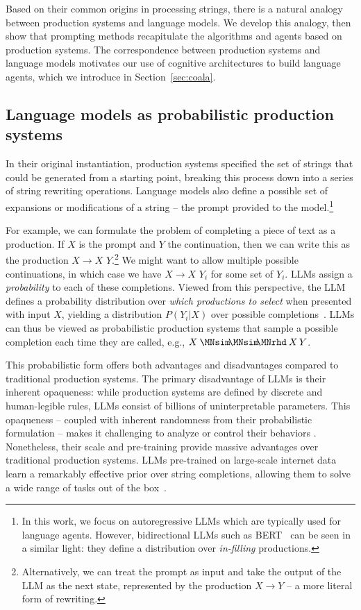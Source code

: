 \documentclass[10pt]{article} %
\newcommand{\squig}{{\MNsim\mkern-3.6mu}}
\newcommand{\rsquigend}{{\mkern-1.2mu\MNrhd}}
\begin{document}
Based on their common origins in processing strings, there is a natural analogy between production systems and language models. We develop this analogy, then show that prompting methods recapitulate the algorithms and agents based on production systems. The correspondence between production systems and language models motivates our use of cognitive architectures to build language agents, which we introduce in Section~\ref{sec:coala}.

\subsection{Language models as probabilistic production systems}

In their original instantiation, production systems specified the set of strings that could be generated from a starting point, breaking this process down into a series of string rewriting operations. Language models also define a possible set of expansions or modifications of a string -- the prompt provided to the model.\footnote{In this work, we focus on autoregressive LLMs which are typically used for language agents. However, bidirectional LLMs such as BERT~\citep{devlin2019bert} can be seen in a similar light: they define a distribution over \emph{in-filling} productions.}  

For example, we can formulate the problem of completing a piece of text as a production. If $X$ is the prompt and $Y$ the continuation, then we can write this as the production $X \rightarrow X \,\, Y$.\footnote{Alternatively, we can treat the prompt as input and take the output of the LLM as the next state, represented by the production $X \rightarrow Y$ -- a more literal form of rewriting.} We might want to allow multiple possible continuations, in which case we have $X \rightarrow X \,\, Y_i$ for some set of $Y_i$. LLMs assign a \emph{probability} to each of these completions. 
Viewed from this perspective, the LLM defines a probability distribution over \emph{which productions to select} when presented with input $X$, yielding a distribution $P(Y_i|X)$ over possible completions~\citep{dohan2022languagemodelcascades}. LLMs can thus be viewed as probabilistic production systems that sample a possible completion each time they are called, e.g., $X\mathbin{\squig\squig\rsquigend} X\,Y$.

This probabilistic form offers both advantages and disadvantages compared to traditional production systems. The primary disadvantage of LLMs is their inherent opaqueness: while production systems are defined by discrete and human-legible rules, LLMs consist of billions of uninterpretable parameters. This opaqueness -- coupled with inherent randomness from their probabilistic formulation -- makes it challenging to analyze or control their behaviors \citep{romero2023synergistic, valmeekam2022large}. Nonetheless, their scale and pre-training provide massive advantages over traditional production systems. LLMs pre-trained on large-scale internet data learn a remarkably effective prior over string completions, allowing them to solve a wide range of tasks out of the box~\citep{huang2022language}. 
\end{document}
